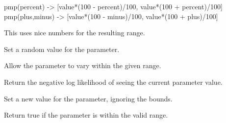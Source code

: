 \documentclass[letterpaper,10pt,english]{sphinxmanual}
\begin{document}
\begin{fulllineitems}
\begin{fulllineitems}
pmp(percent) -\textgreater{} {[}value*(100 - percent)/100, value*(100 + percent)/100{]}
pmp(plus,minus) -\textgreater{} {[}value*(100 - minus)/100, value*(100 + plus)/100{]}

This uses nice numbers for the resulting range.

\end{fulllineitems}


\begin{fulllineitems}
\label{api/mystic.parameter:refl1d.mystic.parameter.VectorParameter.rand}
Set a random value for the parameter.

\end{fulllineitems}


\begin{fulllineitems}
\label{api/mystic.parameter:refl1d.mystic.parameter.VectorParameter.range}
Allow the parameter to vary within the given range.

\end{fulllineitems}


\begin{fulllineitems}
\label{api/mystic.parameter:refl1d.mystic.parameter.VectorParameter.residual}
Return the negative log likelihood of seeing the current parameter value.

\end{fulllineitems}


\begin{fulllineitems}
\label{api/mystic.parameter:refl1d.mystic.parameter.VectorParameter.set}
Set a new value for the parameter, ignoring the bounds.

\end{fulllineitems}


\begin{fulllineitems}
\label{api/mystic.parameter:refl1d.mystic.parameter.VectorParameter.valid}
Return true if the parameter is within the valid range.

\end{fulllineitems}


\end{fulllineitems}
\end{document}
